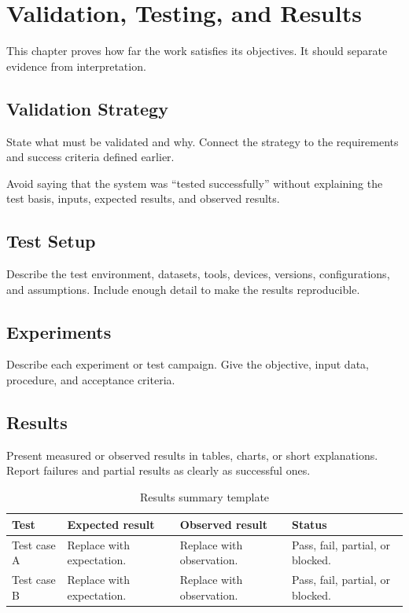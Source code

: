 \chapter{Validation, Testing, and Results}
\label{chap:validation-testing-results}

This chapter proves how far the work satisfies its objectives. It should separate evidence from interpretation.

\section{Validation Strategy}
State what must be validated and why. Connect the strategy to the requirements and success criteria defined earlier.

Avoid saying that the system was ``tested successfully'' without explaining the test basis, inputs, expected results, and observed results.

\section{Test Setup}
Describe the test environment, datasets, tools, devices, versions, configurations, and assumptions. Include enough detail to make the results reproducible.

\section{Experiments}
Describe each experiment or test campaign. Give the objective, input data, procedure, and acceptance criteria.


\section{Results}
Present measured or observed results in tables, charts, or short explanations. Report failures and partial results as clearly as successful ones.

\begin{table}[H]
    \centering
    \caption{Results summary template}
    \label{tab:results-summary-template}
    \small
    \begin{tabular}{L{0.20\textwidth}L{0.24\textwidth}L{0.24\textwidth}L{0.20\textwidth}}
        \toprule
        \textbf{Test} & \textbf{Expected result} & \textbf{Observed result} & \textbf{Status} \\
        \midrule
        Test case A & Replace with expectation. & Replace with observation. & Pass, fail, partial, or blocked. \\
        \tabrowsep
        Test case B & Replace with expectation. & Replace with observation. & Pass, fail, partial, or blocked. \\
        \bottomrule
    \end{tabular}
\end{table}

